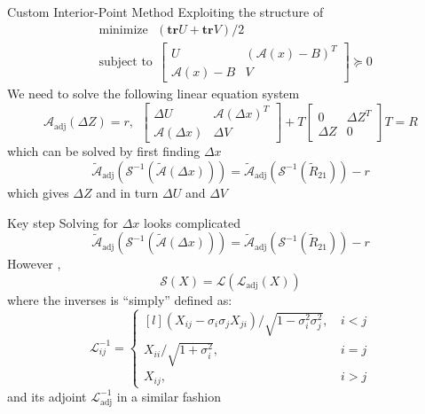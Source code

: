 \documentclass{beamer}
\newcommand{\mA}{\mathcal{A}}
\begin{document}
\begin{frame}{Custom Interior-Point Method}
Exploiting the structure of 
	\begin{equation}
	\begin{split}
		&\text{minimize}~~~(\mathbf{tr}U + \mathbf{tr}V)/2\\
		&\text{subject to}~~\begin{bmatrix}
		U & (\mA(x)-B)^T\\
		\mA(x) - B & V
		\end{bmatrix} \succeq 0
	\end{split}
	\end{equation}
We need to solve the following linear equation system
	\begin{equation}
	\mA_{\text{adj}}(\Delta Z) = r, ~~ \begin{bmatrix}
	\Delta U & \mA(\Delta x)^T\\
	\mA(\Delta x) & \Delta V
	\end{bmatrix}+ T \begin{bmatrix}
	0 & \Delta Z^T\\
	\Delta Z & 0
	\end{bmatrix}T = R
	\end{equation}
	which can be solved by first finding $ \Delta x $
	\begin{equation}
		\tilde{\mA}_\text{adj}(\mathcal{S}^{-1}(\tilde{\mA}(\Delta x)))=\tilde{\mA}_\text{adj}(\mathcal{S}^{-1}(\tilde{R}_{21})) -r
	\end{equation}
	which gives $ \Delta Z $ and in turn $ \Delta U $ and $ \Delta V $
\end{frame}

\begin{frame}{Key step}
Solving for $ \Delta x $ looks complicated
	\begin{equation}
		\tilde{\mA}_\text{adj}(\mathcal{S}^{-1}(\tilde{\mA}(\Delta x)))=\tilde{\mA}_\text{adj}(\mathcal{S}^{-1}(\tilde{R}_{21})) -r
	\end{equation}
However ,
\begin{equation}
	\mathcal{S}(X) = \mathcal{L}(\mathcal{L}_\text{adj}(X))
\end{equation}
where the inverses is ``simply'' defined as:
\begin{equation}
	\mathcal{L}^{-1}_{ij} = 
	\left\{\begin{matrix*}[l]
		(X_{ij} - \sigma_i\sigma_jX_{ji})/\sqrt{1-\sigma_i^2\sigma_j^2},\, &i<j\\
		X_{ii}/\sqrt{1+\sigma_i^2},\,&i=j\\
		X_{ij},\,&i>j
	\end{matrix*}\right.
\end{equation}
and its adjoint $ \mathcal{L}_\text{adj}^{-1} $ in a similar fashion
\end{frame}
\end{document}
